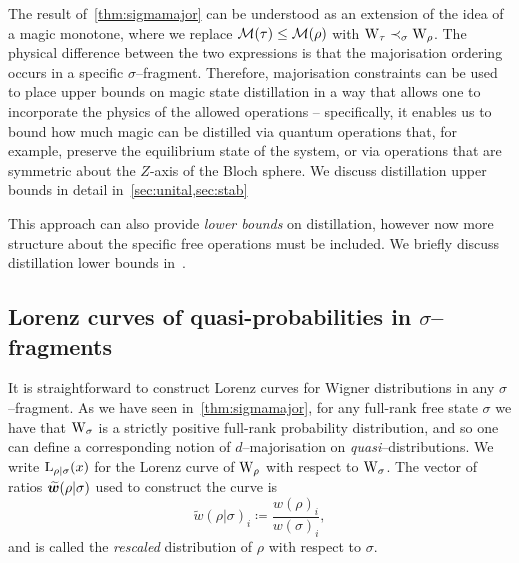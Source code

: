 \documentclass[pra,
aps,
twocolumn,
superscriptaddress,
groupedaddress,
nofootinbib,
reprint
]{revtex4-1}
\begin{document}
The result of~\cref{thm:sigmamajor} can be understood as an extension of the idea of a magic monotone, where we replace $\mathcal{M}(\tau) \leq \mathcal{M}(\rho)$ with $\W{\tau} \prec_\sigma \W{\rho}$. 
The physical difference between the two expressions is that the majorisation ordering occurs in a specific $\sigma$--fragment.
Therefore, majorisation constraints can be used to place upper bounds on magic state distillation in a way that allows one to incorporate the physics of the allowed operations -- specifically, it enables us to bound how much magic can be distilled via quantum operations that, for example, preserve the equilibrium state of the system, or via operations that are symmetric about the $Z$-axis of the Bloch sphere.
We discuss distillation upper bounds in detail in~\cref{sec:unital,sec:stab}

This approach can also provide \emph{lower bounds} on distillation, however now more structure about the specific free operations must be included. 
We briefly discuss distillation lower bounds in~.


\subsection{Lorenz curves of quasi-probabilities in $\sigma$--fragments}

It is straightforward to construct Lorenz curves for Wigner distributions in any $\sigma$--fragment.
As we have seen in~\cref{thm:sigmamajor}, for any full-rank free state $\sigma$ we have that $\W{\sigma}$ is a strictly positive full-rank probability distribution, and so one can define a corresponding notion of $d$--majorisation on \emph{quasi}--distributions.
We write ${{\rm{L}}_{\rho|\sigma}}(x)$ for the Lorenz curve of $\W{\rho}$ with respect to $\W{\sigma}$.
The vector of ratios $\widetilde{\bm{w}}(\rho|\sigma)$ used to construct the curve is
\begin{equation}
	\widetilde{w}(\rho|\sigma)_i \coloneqq \frac{w(\rho)_i}{w(\sigma)_i},
\end{equation}
and is called the \emph{rescaled} distribution of $\rho$ with respect to $\sigma$.
\end{document}
